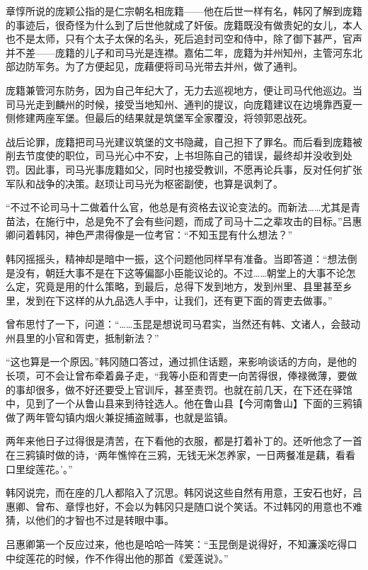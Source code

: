 章惇所说的庞颖公指的是仁宗朝名相庞籍——他在后世一样有名，韩冈了解到庞籍的事迹后，很奇怪为什么到了后世他就成了奸佞。庞籍既没有做贵妃的女儿，本人也不是太师，只有个太子太保的名头，死后追封司空和侍中，除了御下甚严，官声并不差——庞籍的儿子和司马光是连襟。嘉佑二年，庞籍为并州知州，主管河东北部边防军务。为了方便起见，庞藉便将司马光带去并州，做了通判。

庞籍兼管河东防务，因为自己年纪大了，无力去巡视地方，便让司马代他巡边。当司马光走到麟州的时候，接受当地知州、通判的提议，向庞籍建议在边境靠西夏一侧修建两座军堡。但最后的结果就是筑堡军全家覆没，将领郭恩战死。

战后论罪，庞籍把司马光建议筑堡的文书隐藏，自己担下了罪名。而后看到庞籍被削去节度使的职位，司马光心中不安，上书坦陈自己的错误，最终却并没收到处罚。因此事，司马光事庞籍如父，同时也接受教训，不愿再论兵事，反对任何扩张军队和战争的决策。赵顼让司马光为枢密副使，也算是讽刺了。

“不过不论司马十二做着什么官，他总是有资格去议论变法的。而新法……尤其是青苗法，在施行中，总是免不了会有些问题，而成了司马十二之辈攻击的目标。”吕惠卿问着韩冈，神色严肃得像是一位考官：“不知玉昆有什么想法？”

韩冈摇摇头，精神却是暗中一振，这个问题他同样早有准备。当即答道：“想法倒是没有，朝廷大事不是在下这等偏鄙小臣能议论的。不过……朝堂上的大事不论怎么定，究竟是用的什么策略，到最后，总得下发到地方，发到州里、县里甚至乡里，发到在下这样的从九品选人手中，让我们，还有更下面的胥吏去做事。”

曾布思忖了一下，问道：“……玉昆是想说司马君实，当然还有韩、文诸人，会鼓动州县里的小官和胥吏，抵制新法？”

“这也算是一个原因。”韩冈随口答过，通过抓住话题，来影响谈话的方向，是他的长项，可不会让曾布牵着鼻子走，“我等小臣和胥吏一向苦得很，俸禄微薄，要做的事却很多，做不好还要受上官训斥，甚至责罚。也就在前几天，在下还在驿馆中，见到了一个从鲁山县来到待铨选人。他在鲁山县【今河南鲁山】下面的三鸦镇做了两年管勾镇内烟火兼捉捕盗贼事，也就是监镇。

两年来他日子过得很是清苦，在下看他的衣服，都是打着补丁的。还听他念了一首在三鸦镇时做的诗，‘两年憔悴在三鸦，无钱无米怎养家，一日两餐准是藕，看看口里绽莲花。’。”

韩冈说完，而在座的几人都陷入了沉思。韩冈说这些自然有用意，王安石也好，吕惠卿、曾布、章惇也好，不会以为韩冈只是随口说个笑话。不过韩冈的用意也不难猜，以他们的才智也不过是转眼中事。

吕惠卿第一个反应过来，他也是哈哈一阵笑：“玉昆倒是说得好，不知濂溪吃得口中绽莲花的时候，作不作得出他的那首《爱莲说》。”

